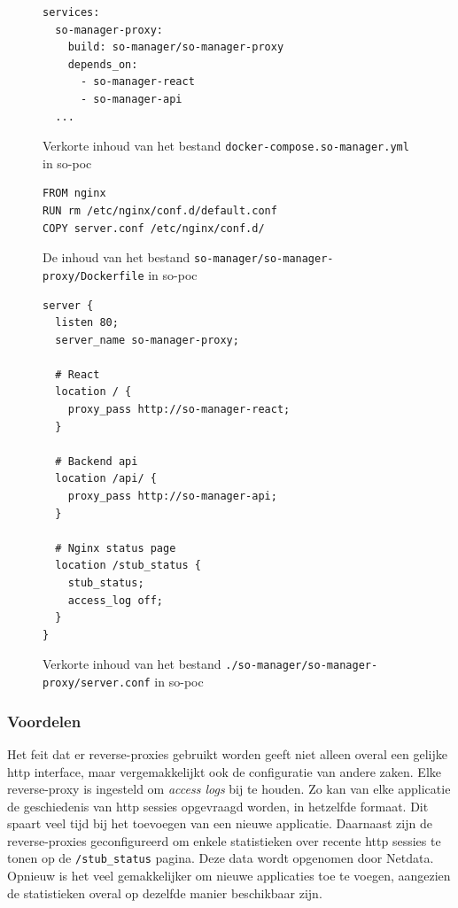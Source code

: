 \documentclass[a4paper,12pt]{report}
\begin{document}
\begin{figure}[H]
  \begin{lstlisting}
services:
  so-manager-proxy:
    build: so-manager/so-manager-proxy
    depends_on:
      - so-manager-react
      - so-manager-api
  ...
  \end{lstlisting}
  \caption{Verkorte inhoud van het bestand \lstinline|docker-compose.so-manager.yml| in so-poc}
  \label{fig:proxy-voorbeeld-compose}
\end{figure}

\begin{figure}[H]
  \begin{lstlisting}
FROM nginx
RUN rm /etc/nginx/conf.d/default.conf
COPY server.conf /etc/nginx/conf.d/
  \end{lstlisting}
  \caption{De inhoud van het bestand \lstinline|so-manager/so-manager-proxy/Dockerfile| in so-poc}
  \label{fig:proxy-voorbeeld-dockerfile}
\end{figure}

\begin{figure}[H]
  \begin{lstlisting}
server {
  listen 80;
  server_name so-manager-proxy;

  # React
  location / {
    proxy_pass http://so-manager-react;
  }

  # Backend api
  location /api/ {
    proxy_pass http://so-manager-api;
  }

  # Nginx status page
  location /stub_status {
    stub_status;
    access_log off;
  }
}
  \end{lstlisting}
  \caption{Verkorte inhoud van het bestand \lstinline|./so-manager/so-manager-proxy/server.conf| in so-poc}
  \label{fig:proxy-voorbeeld-server-conf}
\end{figure}


\subsubsection{Voordelen}
Het feit dat er reverse-proxies gebruikt worden geeft niet alleen overal een gelijke http interface, maar vergemakkelijkt ook de configuratie van andere zaken.
Elke reverse-proxy is ingesteld om \emph{access logs} bij te houden.
Zo kan van elke applicatie de geschiedenis van http sessies opgevraagd worden, in hetzelfde formaat.
Dit spaart veel tijd bij het toevoegen van een nieuwe applicatie.
Daarnaast zijn de reverse-proxies geconfigureerd om enkele statistieken over recente http sessies te tonen op de \lstinline|/stub_status| pagina.
Deze data wordt opgenomen door Netdata.
Opnieuw is het veel gemakkelijker om nieuwe applicaties toe te voegen, aangezien de statistieken overal op dezelfde manier beschikbaar zijn.
\end{document}
